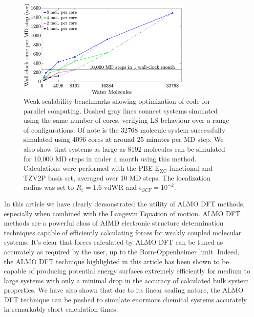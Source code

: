 \documentclass[aps,prl,reprint,amsmath,amssymb]{revtex4-1}
\begin{document}

\begin{figure}
\includegraphics[trim={1.6cm 0cm 4.7cm 0cm},clip,width=8.6cm]{weakscaling.eps}
\caption{\label{fig:weakscaling} Weak scalability benchmarks showing optimization of code for parallel computing.
Dashed gray lines connect systems simulated using the same number of cores, verifying LS behaviour over a range of configurations.
Of note is the 32768 molecule system successfully simulated using 4096 cores at around 25 minutes per MD step.
We also show that systems as large as 8192 molecules can be simulated for 10,000 MD steps in under a month using this method.
Calculations were performed with the PBE $\mathrm{E_{XC}}$ functional and TZV2P basis set, averaged over 10 MD steps. 
The localization radius was set to $R_{c} = 1.6$ vdWR and $\epsilon_{SCF} = 10^{-2}$.}
\end{figure}


In this article we have clearly demonstrated the utility of ALMO DFT methods, especially when combined with the Langevin Equation of motion.
ALMO DFT methods are a powerful class of AIMD electronic structure determination techniques capable of efficiently calculating forces for weakly coupled molecular systems.
It's clear that forces calculated by ALMO DFT can be tuned as accurately as required by the user, up to the Born-Oppenheimer limit.
Indeed, the ALMO DFT technique highlighted in this article has been shown to be capable of producing potential energy surfaces extremely efficiently for medium to large systems with only a minimal drop in the accuracy of calculated bulk system properties.
We have also shown that due to its linear scaling nature, the ALMO DFT technique can be pushed to simulate enormous chemical systems accurately in remarkably short calculation times.
\end{document}

